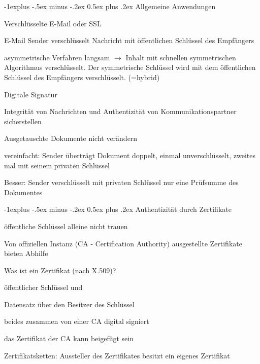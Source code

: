 \documentclass[a4paper]{article}
\makeatletter
\renewcommand{\subsection}{\@startsection{subsection}{2}{0mm}%
                                {-1explus -.5ex minus -.2ex}%
                                {0.5ex plus .2ex}%
                                {\normalfont\normalsize\bfseries}}
\makeatother
\begin{document}
\begin{multicols*}{3}
  \subsection{Allgemeine Anwendungen}
  \begin{itemize*}
    \item Verschlüsselte E-Mail oder SSL
    \begin{itemize*}
      \item E-Mail Sender verschlüsselt Nachricht mit öffentlichen Schlüssel des Empfängers
      \item asymmetrische Verfahren langsam $\rightarrow$ Inhalt mit schnellen symmetrischen Algorithmus verschlüsselt. Der symmetrische Schlüssel wird mit dem öffentlichen Schlüssel des Empfängers verschlüsselt. (=hybrid)
    \end{itemize*}
    \item Digitale Signatur
    \begin{itemize*}
      \item Integrität von Nachrichten und Authentizität von Kommunikationspartner sicherstellen
      \item Ausgetauschte Dokumente nicht verändern
      \item vereinfacht: Sender überträgt Dokument doppelt, einmal unverschlüsselt, zweites mal mit seinem privaten Schlüssel
      \item Besser: Sender verschlüsselt mit privaten Schlüssel nur eine Prüfsumme des Dokumentes
    \end{itemize*}
  \end{itemize*}

  \subsection{Authentizität durch Zertifikate}
  \begin{itemize*}
    \item öffentliche Schlüssel alleine nicht trauen
    \item Von offiziellen Instanz (CA - Certification Authority) ausgestellte Zertifikate bieten Abhilfe
    \item Was ist ein Zertifikat (nach X.509)?
    \begin{itemize*}
      \item öffentlicher Schlüssel und
      \item Datensatz über den Besitzer des Schlüssel
      \item beides zusammen von einer CA digital signiert
      \item das Zertifikat der CA kann beigefügt sein
    \end{itemize*}
    \item Zertifikatsketten: Aussteller des Zertifikates besitzt ein eigenes Zertifikat
  \end{itemize*}


\end{multicols*}
\end{document}
